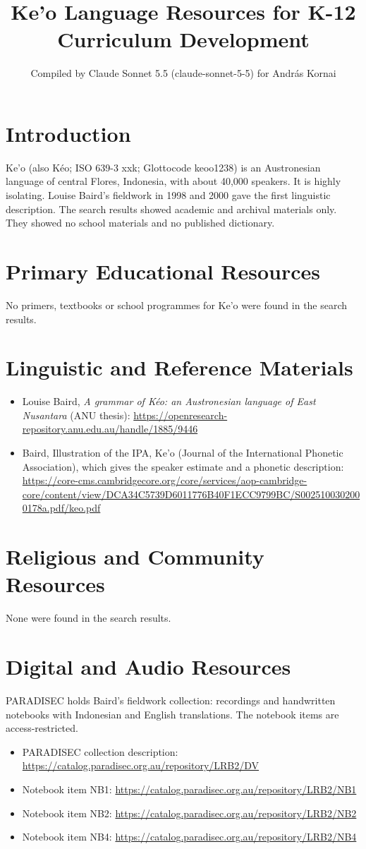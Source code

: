 \documentclass[12pt]{article}
\title{Ke'o Language Resources for K-12 Curriculum Development}
\author{Compiled by Claude Sonnet 5.5 (claude-sonnet-5-5) for Andr\'as Kornai}
\date{}
\begin{document}
\maketitle

\section{Introduction}
Ke'o (also K\'eo; ISO 639-3 xxk; Glottocode keoo1238) is an Austronesian language of central Flores, Indonesia, with about 40,000 speakers. It is highly isolating. Louise Baird's fieldwork in 1998 and 2000 gave the first linguistic description. The search results showed academic and archival materials only. They showed no school materials and no published dictionary.

\section{Primary Educational Resources}
No primers, textbooks or school programmes for Ke'o were found in the search results.

\section{Linguistic and Reference Materials}
\begin{itemize}
\item Louise Baird, \emph{A grammar of K\'eo: an Austronesian language of East Nusantara} (ANU thesis): \url{https://openresearch-repository.anu.edu.au/handle/1885/9446}
\item Baird, Illustration of the IPA, Ke'o (Journal of the International Phonetic Association), which gives the speaker estimate and a phonetic description: \url{https://core-cms.cambridgecore.org/core/services/aop-cambridge-core/content/view/DCA34C5739D6011776B40F1ECC9799BC/S0025100302000178a.pdf/keo.pdf}
\end{itemize}

\section{Religious and Community Resources}
None were found in the search results.

\section{Digital and Audio Resources}
PARADISEC holds Baird's fieldwork collection: recordings and handwritten notebooks with Indonesian and English translations. The notebook items are access-restricted.
\begin{itemize}
\item PARADISEC collection description: \url{https://catalog.paradisec.org.au/repository/LRB2/DV}
\item Notebook item NB1: \url{https://catalog.paradisec.org.au/repository/LRB2/NB1}
\item Notebook item NB2: \url{https://catalog.paradisec.org.au/repository/LRB2/NB2}
\item Notebook item NB4: \url{https://catalog.paradisec.org.au/repository/LRB2/NB4}
\end{itemize}
\end{document}
